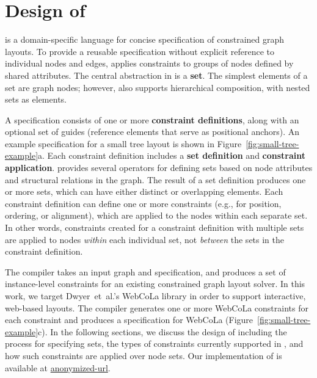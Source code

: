 \section{Design of \projectname}
\projectname is a domain-specific language for concise specification of 
constrained graph layouts. To provide a reusable specification 
without explicit reference to individual nodes and edges, \projectname
applies constraints to groups of nodes defined by shared attributes. 
The central abstraction in \projectname is a \textbf{set}. The 
simplest elements of a set are graph nodes; however, \projectname also
supports hierarchical composition, with nested sets as elements.

A \projectname specification consists of one or more \textbf{constraint definitions},
along with an optional set of guides (reference elements that serve as 
positional anchors). An example \projectname specification for a small tree 
layout is shown in Figure~\ref{fig:small-tree-example}a. Each constraint 
definition includes a \textbf{set definition} and \textbf{constraint application}.
\projectname provides several operators for defining
sets based on node attributes and structural relations in the graph.
The result of a set definition produces one or more sets, which 
can have either distinct or overlapping elements. Each constraint definition can 
define one or more constraints (e.g., for position, ordering, 
or alignment), which are applied to the nodes within each separate set. 
In other words, constraints created for a constraint definition with multiple sets are 
applied to nodes \emph{within} each individual set, not \emph{between} 
the sets in the constraint definition.

The \projectname compiler takes an input graph 
and specification, and produces a set of instance-level constraints for 
an existing constrained graph layout solver. In this work, we target 
Dwyer~et~al.'s WebCoLa library \cite{WebCoLa} in order to support
interactive, web-based layouts. The \projectname compiler generates one
or more WebCoLa constraints for each \projectname constraint and produces a
specification for WebCoLa (Figure~\ref{fig:small-tree-example}c).
 In the following sections, 
we discuss the design of \projectname including the process for 
specifying sets, the types of constraints currently supported in \projectname, 
and how such constraints are applied over node sets. 
Our implementation of \projectname is available at \url{anonymized-url}.

\smallTreeExampleWebCoLa

